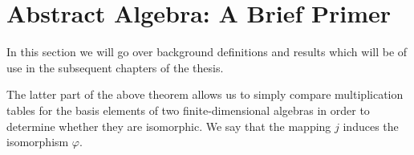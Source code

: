 \section{Abstract Algebra: A Brief Primer}\label{s:algebra}
In this section we will go over background definitions and results which will be of use in the subsequent chapters of the thesis.

%
%
%
%
%
%
%
%
%
%








	
The latter part of the above theorem allows us to simply compare multiplication tables for the basis elements of two finite-dimensional algebras in order to determine whether they are isomorphic. We say that the mapping $j$ induces the isomorphism $\varphi$.

%





